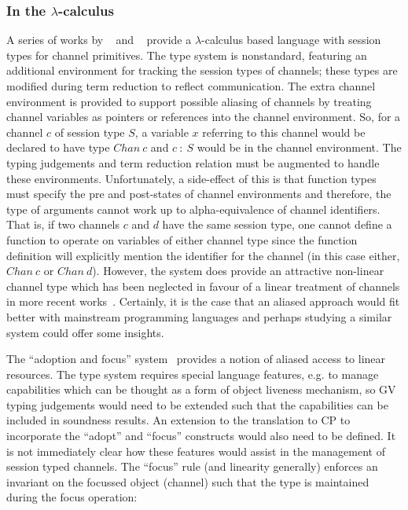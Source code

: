 \documentclass{mprop}
\begin{document}
\subsubsection{In the \texorpdfstring{$\lambda$}{lambda}-calculus}
\label{sec:lam}

A series of works by \citeauthor{Gay:2003:STI}~\cite{Gay:2003:STI} and
\citeauthor{Vasconcelos:2006:TCM}~\cite{Vasconcelos:2006:TCM} provide a
$\lambda$-calculus based language with session types for channel
primitives. The type system is nonstandard, featuring an additional
environment for tracking the session types of channels; these types are
modified during term reduction to reflect communication. The extra channel
environment is provided to support possible aliasing of channels by treating
channel variables as pointers or references into the channel environment. So,
for a channel $c$ of session type $S$, a variable $x$ referring to this
channel would be declared to have type $Chan~c$ and $c~:~S$ would be in the
channel environment. The typing judgements and term reduction relation must be
augmented to handle these environments. Unfortunately, a side-effect of this
is that function types must specify the pre and post-states of channel
environments and therefore, the type of arguments cannot work up to
alpha-equivalence of channel identifiers. That is, if two channels $c$ and $d$
have the same session type, one cannot define a function to operate on
variables of either channel type since the function definition will explicitly
mention the identifier for the channel (in this case either, $Chan~c$ or
$Chan~d$). However, the system does provide an attractive non-linear channel
type which has been neglected in favour of a linear treatment of channels in
more recent
works~\cite{Gay:2010:LAST,Mazurak:2010:LCC,Wadler:2014}. Certainly, it is the
case that an aliased approach would fit better with mainstream programming
languages and perhaps studying a similar system could offer some insights.

The ``adoption and focus'' system~\cite{Fahndrich:2002} provides a notion of
aliased access to linear resources. The type system requires special language
features, e.g. to manage capabilities which can be thought as a form of object
liveness mechanism, so GV typing judgements would need to be extended such
that the capabilities can be included in soundness results. An extension to the
translation to CP to incorporate the ``adopt'' and ``focus'' constructs would
also need to be defined. It is not immediately clear how these features would
assist in the management of session typed channels. The ``focus'' rule (and
linearity generally) enforces an invariant on the focussed object (channel)
such that the type is maintained during the focus operation:

\end{document}
